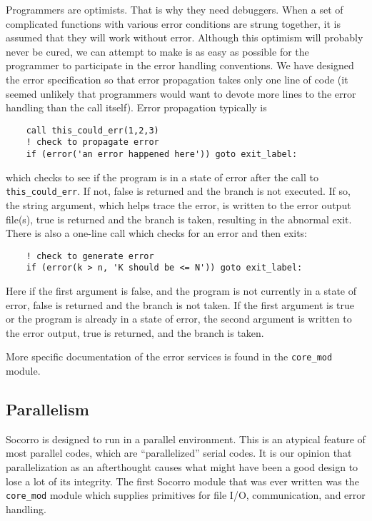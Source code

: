 Programmers are optimists.  That is why they need debuggers.  When a set
of complicated functions with various error conditions are strung
together, it is assumed that they will work without error.  Although
this optimism will probably never be cured, we can attempt to make is
as easy as possible for the programmer to participate in the error
handling conventions.  We have designed the error specification so 
that error propagation takes only one line of code (it seemed unlikely
that programmers would want to devote more lines to the error handling
than the call itself).  Error propagation typically is
\begin{verbatim}
    call this_could_err(1,2,3)
    ! check to propagate error
    if (error('an error happened here')) goto exit_label:
\end{verbatim}
which checks to see if the program is in a state of error after the
call to \verb+this_could_err+.  If not, false is returned and the
branch is not executed.  If so, the string argument, which helps trace
the error, is written to the error output file(s), true is returned
and the branch is taken, resulting in the abnormal exit.  There is
also a one-line call which checks for an error and then exits: 
\begin{verbatim}
    ! check to generate error
    if (error(k > n, 'K should be <= N')) goto exit_label:
\end{verbatim}
Here if the first argument is false, and the program is not currently in
a state of error, false is returned and the branch is not taken.  If
the first argument is true or the program is already in a state of error,
the second argument is written to the error output, true is returned, and
the branch is taken.

More specific documentation of the error services is found in the
\verb+core_mod+ module.

\subsection{Parallelism}

Socorro is designed to run in a parallel environment.  This is an
atypical feature of most parallel codes, which are ``parallelized''
serial codes.  It is our opinion that parallelization as an
afterthought causes what might have been a good design to lose a lot
of its integrity.  The first Socorro module that was ever written was
the \verb+core_mod+ module which supplies primitives for file I/O,
communication, and error handling.

